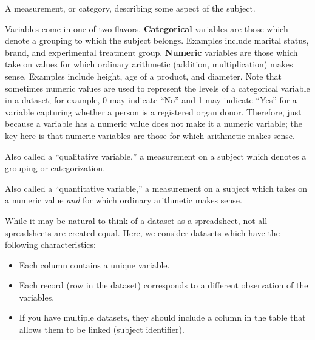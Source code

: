 \documentclass[]{book}
\providecommand{\tightlist}{%
  \setlength{\itemsep}{0pt}\setlength{\parskip}{0pt}}
\theoremstyle{definition}
\theoremstyle{definition}
\theoremstyle{definition}
\theoremstyle{remark}
\let\BeginKnitrBlock\begin \let\EndKnitrBlock\end
\begin{document}
\BeginKnitrBlock{definition}[Variable]
\protect\hypertarget{def:defn-variable}{}{\label{def:defn-variable}
{} }A measurement, or category, describing some
aspect of the subject.
\EndKnitrBlock{definition}

Variables come in one of two flavors. \textbf{Categorical} variables are
those which denote a grouping to which the subject belongs. Examples
include marital status, brand, and experimental treatment group.
\textbf{Numeric} variables are those which take on values for which
ordinary arithmetic (addition, multiplication) makes sense. Examples
include height, age of a product, and diameter. Note that sometimes
numeric values are used to represent the levels of a categorical
variable in a dataset; for example, 0 may indicate ``No'' and 1 may
indicate ``Yes'' for a variable capturing whether a person is a
registered organ donor. Therefore, just because a variable has a numeric
value does not make it a numeric variable; the key here is that numeric
variables are those for which arithmetic makes sense.

\BeginKnitrBlock{definition}[Categorical Variable]
\protect\hypertarget{def:defn-categorical}{}{\label{def:defn-categorical}
{} }Also called a ``qualitative
variable,'' a measurement on a subject which denotes a grouping or
categorization.
\EndKnitrBlock{definition}

\BeginKnitrBlock{definition}[Numeric Variable]
\protect\hypertarget{def:defn-numeric}{}{\label{def:defn-numeric}
{} }Also called a ``quantitative
variable,'' a measurement on a subject which takes on a numeric value
\emph{and} for which ordinary arithmetic makes sense.
\EndKnitrBlock{definition}

While it may be natural to think of a dataset as a spreadsheet, not all
spreadsheets are created equal. Here, we consider datasets which have
the following characteristics:

\begin{itemize}
\tightlist
\item
  Each column contains a unique variable.
\item
  Each record (row in the dataset) corresponds to a different
  observation of the variables.
\item
  If you have multiple datasets, they should include a column in the
  table that allows them to be linked (subject identifier).
\end{itemize}
\end{document}
